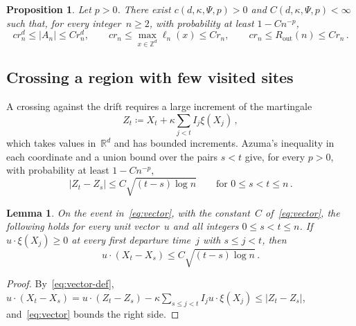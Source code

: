 \documentclass[11pt]{amsart}
\theoremstyle{plain}
\newtheorem{proposition}[theorem]{Proposition}
\newtheorem{lemma}[theorem]{Lemma}
\theoremstyle{definition}
\newcommand{\Z}{\mathbb Z}
\newcommand{\R}{\mathbb R}
\newcommand{\drift}{\kappa}
\newcommand{\gauge}{\Psi}
\newcommand{\Rout}{R_{\mathrm{out}}}
\numberwithin{equation}{section}
\begin{document}
\begin{proposition}\label{prop:coarse}
Let $p>0$. There exist $c(d,\drift,\gauge,p)>0$ and $C(d,\drift,\gauge,p)<\infty$ such that, for every integer~$n\geq2$, with probability at least $1-Cn^{-p}$,
\begin{equation*}
cr_n^d\leq|A_n|\leq Cr_n^d,\qquad
cr_n\leq\max_{x\in\Z^d}\ell_n(x)\leq Cr_n,\qquad
cr_n\leq\Rout(n)\leq Cr_n\, .
\end{equation*}
\end{proposition}

\subsection{Crossing a region with few visited sites}\label{sec:crossing}

A crossing against the drift requires a large increment of the martingale
\begin{equation}\label{eq:vector-def}
Z_t\coloneqq X_t+\drift\sum_{j<t}I_j\xi(X_j)\, ,
\end{equation}
which takes values in~$\R^d$ and has bounded increments. Azuma's inequality in each coordinate and a union bound over the pairs $s<t$ give, for every $p>0$, with probability at least $1-Cn^{-p}$,
\begin{equation}\label{eq:vector}
|Z_t-Z_s|\leq C\sqrt{(t-s)\log n}
\qquad\text{for } 0\leq s<t\leq n\, .
\end{equation}

\begin{lemma}\label{lem:crossing}
On the event in~\eqref{eq:vector}, with the constant~$C$ of~\eqref{eq:vector}, the following holds for every unit vector~$u$ and all integers $0\leq s<t\leq n$. If $u\cdot\xi(X_j)\geq0$ at every first departure time~$j$ with $s\leq j<t$, then
\begin{equation*}
u\cdot(X_t-X_s)\leq C\sqrt{(t-s)\log n}\, .
\end{equation*}
\end{lemma}

\begin{proof}
By~\eqref{eq:vector-def}, $u\cdot(X_t-X_s)=u\cdot(Z_t-Z_s)-\drift\sum_{s\leq j<t}I_ju\cdot\xi(X_j)\leq|Z_t-Z_s|$, and~\eqref{eq:vector} bounds the right side.
\end{proof}
\end{document}
